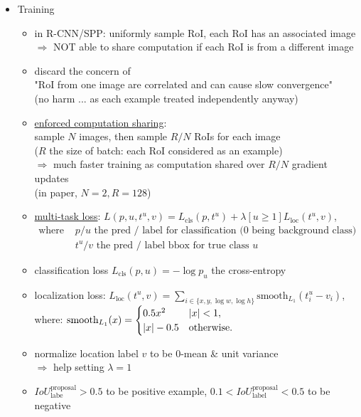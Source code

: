 \begin{itemize}
\begin{itemize}
\begin{itemize}
		\end{itemize}
	\item Training
		\begin{itemize}
		\item in R-CNN/SPP: uniformly sample RoI, each RoI has an associated image \\
		$\Rightarrow$ NOT able to share computation if each RoI is from a different image
		\item discard the concern of \\ 
		"RoI from one image are correlated and can cause slow convergence" \\
		(no harm ... as each example treated independently anyway)
		\item \underline{enforced computation sharing}: \\ 
		sample $N$ images, then sample $R/N$ RoIs for each image \\
		($R$ the size of batch: each RoI considered as an example) \\
		$\Rightarrow$ much faster training as computation shared over $R/N$ gradient updates \\
		(in paper,  $N=2,R=128$)
		\item \underline{multi-task loss}: $L(p,u,t^u,v) = L_\text{cls}(p, t^u) + \lambda [u\ge 1] L_\text{loc}(t^u, v)$,
		\begin{align*}
		\text{where } & p / u \text{ the pred / label for classification (0 being background class)} \\
		& t^u / v \text{ the pred / label bbox for true class } u
		\end{align*}
		\item classification loss $L_\text{cls}(p,u) = -\log p_u$ the cross-entropy
		\item localization loss: $L_\text{loc}(t^u, v) = \sum_{i\in\{x,y,\log w,\log h\}} \text{smooth}_{L_1}(t^u_i - v_i)$, \\
		where: $\text{smooth}_{L_1}(x) = \begin{cases} 0.5x^2 & \lvert x\rvert < 1, \\ \lvert x\rvert - 0.5 & \text{otherwise}. \end{cases}$
		\item normalize location label $v$ to be $0$-mean \& unit variance \\
		$\Rightarrow$ help setting $\lambda=1$
		\item $IoU^\text{proposal}_\text{labe} > 0.5$ to be positive example, $0.1 < IoU^\text{proposal}_\text{label} < 0.5$ to be negative \\

\end{itemize}
\end{itemize}
\end{itemize}
